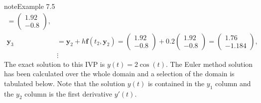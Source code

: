 \documentclass[letterpaper,10pt,english]{jupyterBook}
\begin{document}
\begin{sphinxadmonition}{note}{Example 7.5}
\begin{align*}
    = \begin{pmatrix} 1.92 \\ -0.8 \end{pmatrix},\\
    \mathbf{y}_3 &= \mathbf{y}_2 + h \mathbf{f}(t_2, \mathbf{y}_2)
    = \begin{pmatrix} 1.92 \\ -0.8 \end{pmatrix} + 0.2 \begin{pmatrix} 1.92 \\ -0.8 \end{pmatrix}
    = \begin{pmatrix} 1.76 \\ -1.184 \end{pmatrix}, \\
    &\vdots
\end{align*}
\sphinxAtStartPar
The exact solution to this IVP is \(y(t) = 2 \cos(t)\). The Euler method solution has been calculated over the whole domain and a selection of the domain is tabulated below. Note that the solution \(y(t)\) is contained in the \(y_1\) column and the \(y_2\) column is the first derivative \(y'(t)\).



\end{sphinxadmonition}
\end{document}
